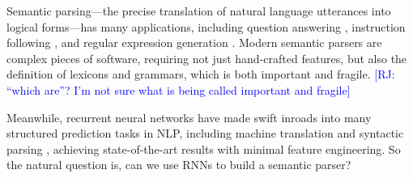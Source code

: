 \documentclass[11pt,letterpaper]{article}
\newcommand\pl[1]{\textcolor{red}{[PL: #1]}}
\newcommand\rj[1]{\textcolor{blue}{[RJ: #1]}}
\begin{document}
Semantic parsing---the precise translation of natural language utterances into 
logical forms---has many applications,
including question answering \cite{zelle96geoquery,zettlemoyer05ccg,zettlemoyer07relaxed,liang11dcs,berant2013freebase},
instruction following \cite{artzi2013weakly},
and regular expression generation \cite{kushman2013regex}.
Modern semantic parsers \cite{artzi2013uw,berant2013freebase} are complex pieces of software,
requiring not just hand-crafted features,
but also the definition of lexicons and grammars,
which is both important and fragile.
\rj{``which are''?  I'm not sure what is being called important and fragile}


Meanwhile, recurrent neural networks have made swift inroads into 
many structured prediction tasks in NLP,
including machine translation
\cite{sutskever2014sequence,bahdanau2014neural} and
syntactic parsing \cite{vinyals2015grammar,dyer2015transition},
achieving state-of-the-art results with minimal feature engineering.
So the natural question is, 
can we use RNNs to build a semantic parser?  %

\end{document}
